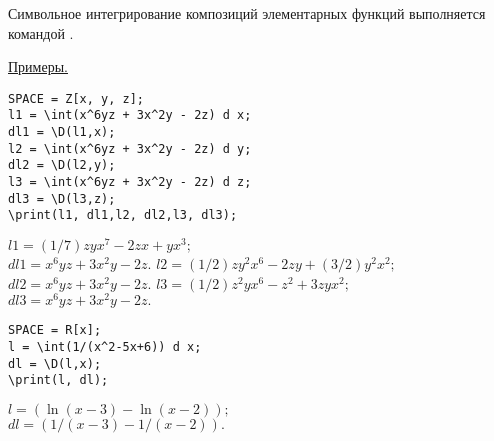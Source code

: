 Символьное интегрирование композиций элементарных функций выполняется командой  
.

\smallskip
\underline{Примеры. }

\begin{verbatim}
SPACE = Z[x, y, z];
l1 = \int(x^6yz + 3x^2y - 2z) d x;
dl1 = \D(l1,x);
l2 = \int(x^6yz + 3x^2y - 2z) d y;
dl2 = \D(l2,y);
l3 = \int(x^6yz + 3x^2y - 2z) d z;
dl3 = \D(l3,z);
\print(l1, dl1,l2, dl2,l3, dl3);
\end{verbatim}
\vspace*{-3mm}

{
$l1 = (1/7)zyx^7-2zx+yx^3; $\\
\hspace*{4mm} $dl1 = x^6yz + 3x^2y - 2z. $
$l2 = (1/2)zy^2x^6-2zy+(3/2)y^2x^2; $\\
\hspace*{4mm} $dl2 = x^6yz + 3x^2y - 2z.$
$l3 = (1/2)z^2yx^6-z^2+3zyx^2; $\\
\hspace*{4mm} $dl3 = x^6yz + 3x^2y - 2z.$
}


\begin{verbatim}
SPACE = R[x];
l = \int(1/(x^2-5x+6)) d x;
dl = \D(l,x);
\print(l, dl);
\end{verbatim}
\vspace*{-3mm}

{
$l = (\ln(x-3)-\ln(x-2)); $\\
\hspace*{4mm} $dl = (1/(x-3)-1/(x-2)). $
}

